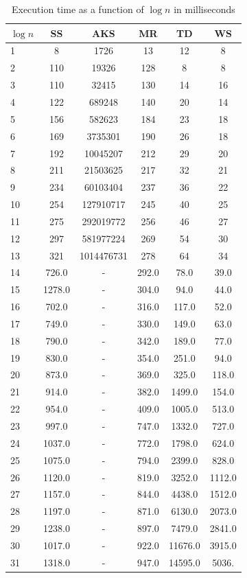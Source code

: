 \begin{table}
    \centering
    \caption{Execution time as a function of $\log n$ in milliseconds}
    \begin{tabular}{|l|c|c|c|c|c|} \hline
        $\log n$ & SS & AKS & MR & TD & WS \\
        \hline
1 & 8 & 1726 & 13 & 12 & 8 \\
2 & 110 & 19326 & 128 & 8 & 8 \\
3 & 110 & 32415 & 130 & 14 & 16 \\
4 & 122 & 689248 & 140 & 20 & 14 \\
5 & 156 & 582623 & 184 & 23 & 18 \\
6 & 169 & 3735301 & 190 & 26 & 18 \\
7 & 192 & 10045207 & 212 & 29 & 20 \\
8 & 211 & 21503625 & 217 & 32 & 21 \\
9 & 234 & 60103404 & 237 & 36 & 22 \\
10& 254 & 127910717 & 245 & 40 & 25 \\
11& 275 & 292019772 & 256 & 46 & 27 \\
12& 297 & 581977224 & 269 & 54 & 30 \\
13& 321 & 1014476731 & 278 & 64 & 34 \\
14& 726.0 & - & 292.0 & 78.0 & 39.0 \\
15& 1278.0 & - & 304.0 & 94.0 & 44.0 \\
16& 702.0 & - & 316.0 & 117.0 & 52.0 \\
17& 749.0 & - & 330.0 & 149.0 & 63.0 \\
18& 790.0 & - & 342.0 & 189.0 & 77.0 \\
19& 830.0 & - & 354.0 & 251.0 & 94.0 \\
20& 873.0 & - & 369.0 & 325.0 & 118.0 \\
21& 914.0 & - & 382.0 & 1499.0 & 154.0 \\
22& 954.0 & - & 409.0 & 1005.0 & 513.0 \\
23& 997.0 & - & 747.0 & 1332.0 & 727.0 \\
24& 1037.0 & - & 772.0 & 1798.0 & 624.0 \\
25& 1075.0 & - & 794.0 & 2399.0 & 828.0 \\
26& 1120.0 & - & 819.0 & 3252.0 & 1112.0 \\
27& 1157.0 & - & 844.0 & 4438.0 & 1512.0 \\
28& 1197.0 & - & 871.0 & 6130.0 & 2073.0 \\
29& 1238.0 & - & 897.0 & 7479.0 & 2841.0 \\
30& 1017.0 & - & 922.0 & 11676.0 & 3915.0 \\
31& 1318.0 & - & 947.0 & 14595.0 & 5036. \\
        \hline
    \end{tabular}
    \label{table:runtime}
\end{table}

